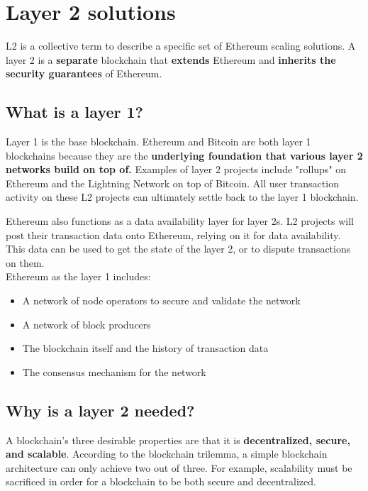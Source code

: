 \documentclass[MSE,Master,english]{twbook}%
\begin{document}
\section{Layer 2 solutions\label{layer2}}
\ac{L2}\cite{l2} is a collective term to describe a specific set of Ethereum scaling solutions. A layer 2 is a \textbf{separate} blockchain that \textbf{extends} Ethereum and \textbf{inherits the security guarantees} of Ethereum.

\subsection{What is a layer 1?}
Layer 1 is the base blockchain.\cite{l2} Ethereum and Bitcoin are both layer 1 blockchains because they are the \textbf{underlying foundation that various layer 2 networks build on top of.} Examples of layer 2 projects include "rollups" on Ethereum and the Lightning Network on top of Bitcoin. All user transaction activity on these \gls{L2} projects can ultimately settle back to the layer 1 blockchain.

Ethereum also functions as a data availability layer for layer 2s. \gls{L2} projects will post their transaction data onto Ethereum, relying on it for data availability. This data can be used to get the state of the layer 2, or to dispute transactions on them. \\

Ethereum as the layer 1 includes:

\begin{itemize}
  \item A network of node operators to secure and validate the network
  \item A network of block producers
  \item The blockchain itself and the history of transaction data
  \item The consensus mechanism for the network
\end{itemize}

\subsection{Why is a layer 2 needed?}
A blockchain's three desirable properties are that it is \textbf{decentralized, secure, and scalable}.\cite{l2} According to the blockchain trilemma, a simple blockchain architecture can only achieve two out of three. For example, scalability must be sacrificed in order for a blockchain to be both secure and decentralized.
\end{document}
